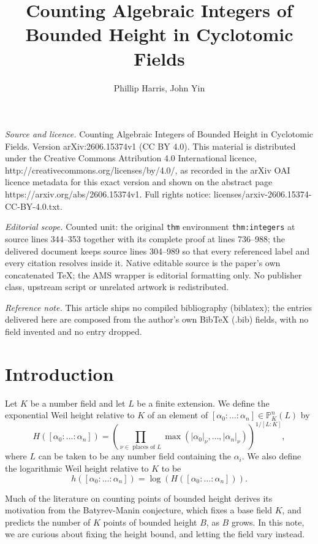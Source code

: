 \documentclass[10pt,a4paper]{amsart}
\def\bbP{ {\mathbb P}}
\begin{document}
\title[Counting Algebraic Integers of Bounded Height in Cyclotomic ]{Counting Algebraic Integers of Bounded Height in Cyclotomic Fields}
\author{Phillip Harris, John Yin}
\date{}
\maketitle
\noindent\emph{Source and licence.} Counting Algebraic Integers of Bounded Height in Cyclotomic Fields. Version arXiv:2606.15374v1 (CC BY 4.0). This material is distributed under the Creative Commons Attribution 4.0 International licence, http://creativecommons.org/licenses/by/4.0/, as recorded in the arXiv OAI licence metadata for this exact version and shown on the abstract page https://arxiv.org/abs/2606.15374v1. Full rights notice: licenses/arxiv-2606.15374-CC-BY-4.0.txt.\par\smallskip
\noindent\textit{Editorial scope.} Counted unit: the original \texttt{thm} environment \texttt{thm:integers} at source lines 344--353 together with its complete proof at lines 736--988; the delivered document keeps source lines 304--989 so that every referenced label and every citation resolves inside it. Native editable source is the paper's own concatenated TeX; the AMS wrapper is editorial formatting only. No publisher class, upstream script or unrelated artwork is redistributed.
\par\smallskip\noindent\textit{Reference note.} This article ships no compiled bibliography (biblatex); the entries delivered here are composed from the author's own BibTeX (.bib) fields, with no field invented and no entry dropped.
\section{Introduction}


Let $K$ be a number field and let $L$ be a finite extension. We define the exponential Weil height relative to $K$ of an element of $[\alpha_0: \dots :\alpha_n] \in \bbP^n_K(L)$ by $$H([\alpha_0:\dots:\alpha_n]) = \left(\prod_{\nu \in \text{ places of }L} \max(|\alpha_0|_{\nu}, \dots, |\alpha_n|_{\nu})\right)^{1/[L:K]},$$ where $L$ can be taken to be any number field containing the $\alpha_i$. We also define the logarithmic Weil height relative to $K$ to be 
\[
h([\alpha_0:\dots:\alpha_n]) =
    \log(H([\alpha_0:\dots:\alpha_n])).
\]

Much of the literature on counting points of bounded height derives its motivation from the Batyrev-Manin conjecture, which fixes a base field $K$, and predicts the number of $K$ points of bounded height $B$, as $B$ grows. In this note, we are curious about fixing the height bound, and letting the field vary instead.
\end{document}
